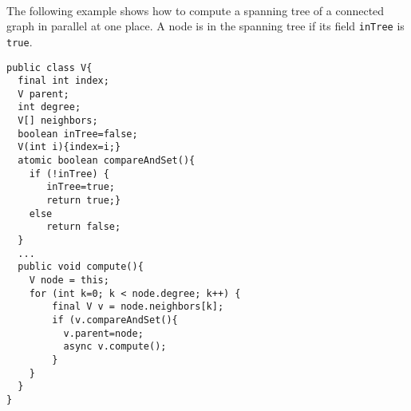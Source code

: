 \paragraph{}The following example shows how to compute a spanning tree of a connected graph in parallel at one place. A node is in the spanning tree if its field {\tt inTree} is {\tt true}.
\begin{center}
{\small
\begin{verbatim}
public class V{
  final int index;
  V parent;
  int degree;
  V[] neighbors;
  boolean inTree=false;
  V(int i){index=i;}
  atomic boolean compareAndSet(){
    if (!inTree) {
       inTree=true;
       return true;}
    else
       return false;
  }
  ...
  public void compute(){
    V node = this;
    for (int k=0; k < node.degree; k++) {
        final V v = node.neighbors[k];
        if (v.compareAndSet(){
          v.parent=node;
          async v.compute();
        }
    }
  }
}
\end{verbatim}
}
\end{center} 
